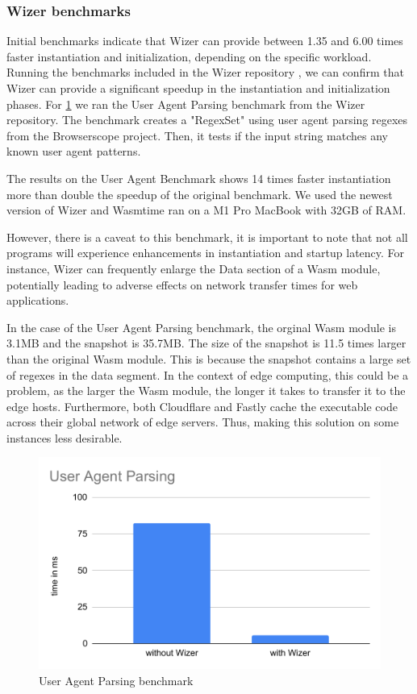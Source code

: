 \subsubsection{Wizer benchmarks}
\label{sec:wizer-benchmarks}

Initial benchmarks indicate that Wizer can provide between 1.35 and 6.00 times faster instantiation and initialization, depending on the specific workload. Running the benchmarks included in the Wizer repository \cite{bytecodealliance_2023_wizer}, we can confirm that Wizer can provide a significant speedup in the instantiation and initialization phases. For \ref{fig:uap-bench} we ran the User Agent Parsing benchmark from the Wizer repository. The benchmark creates a "RegexSet" using user agent parsing regexes from the Browserscope project. Then, it tests if the input string matches any known user agent patterns. 

The results on the User Agent Benchmark shows 14 times faster instantiation more than double the speedup of the original benchmark. We used the newest version of Wizer and Wasmtime ran on a M1 Pro MacBook with 32GB of RAM.

However, there is a caveat to this benchmark, it is important to note that not all programs will experience enhancements in instantiation and startup latency. For instance, Wizer can frequently enlarge the Data section of a Wasm module, potentially leading to adverse effects on network transfer times for web applications. 

In the case of the User Agent Parsing benchmark, the orginal Wasm module is 3.1MB and the snapshot is 35.7MB. The size of the snapshot is 11.5 times larger than the original Wasm module. This is because the snapshot contains a large set of regexes in the data segment.
In the context of \gls{edge computing}, this could be a problem, as the larger the Wasm module, the longer it takes to transfer it to the edge hosts. Furthermore, both Cloudflare and Fastly cache the executable code across their global network of edge servers. Thus, making this solution on some instances less desirable. 

\begin{figure}[H]
	\centering
	\includegraphics[width=0.6\linewidth]{images/runtimes/UAP.pdf}
	\caption{User Agent Parsing benchmark}
	\label{fig:uap-bench}
\end{figure}
